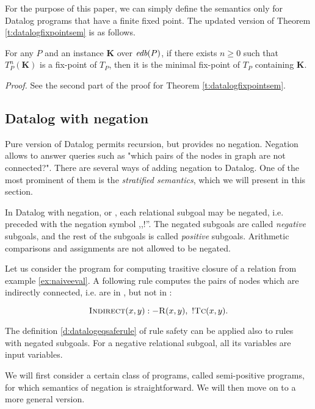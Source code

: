 For the purpose of this paper, we can simply define the semantics only for Datalog programs that have a finite fixed point. The updated version of Theorem \ref{t:datalogfixpointsem} is as follows.

\begin{thm}
For any $P$ and an instance $\textbf{K}$ over $\textit{edb}(P)$, if there exists $n \ge 0$ such that $T_P^n(\textbf{K})$ is a fix-point of $T_P$, then it is the minimal fix-point of $T_P$ containing $\textbf{K}$.
\end{thm}
\emph{Proof.} See the second part of the proof for Theorem \ref{t:datalogfixpointsem}.

\subsection{Datalog with negation}\label{ss:datalogneg}
Pure version of Datalog permits recursion, but provides no negation. Negation allows to answer queries such as "which pairs of the nodes in graph are not connected?". There are several ways of adding negation to Datalog. One of the most prominent of them is the \emph{stratified semantics}, which we will present in this section. 

In Datalog with negation, or \datalogneg, each relational subgoal may be negated, i.e. preceded with the negation symbol ,,$!$''. The negated subgoals are called \emph{negative} subgoals, and the rest of the subgoals is called \emph{positive} subgoals. Arithmetic comparisons and assignments are not allowed to be negated.

\begin{exmp}
Let us consider the program for computing trasitive closure  of a relation  from example \ref{ex:naiveeval}. A following rule computes the pairs of nodes which are indirectly connected, i.e. are in , but not in :

$$\textsc{Indirect}(x, y) :- \textsc{R}(x, y),~!\textsc{Tc}(x, y).$$
\end{exmp}

The definition \ref{d:datalogeqsaferule} of rule safety can be applied also to rules with negated subgoals. For a negative relational subgoal, all its variables are input variables.

We will first consider a certain class of \datalogneg programs, called semi-positive programs, for which semantics of negation is straightforward. We will then move on to a more general version.


